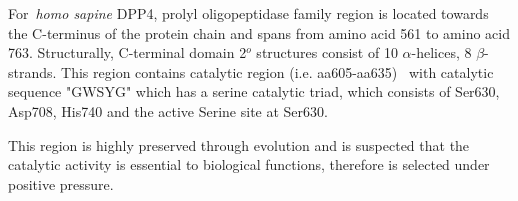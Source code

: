 For~\textit{homo sapine} DPP4, prolyl oligopeptidase family region is located towards the C-terminus of the protein chain and spans from amino acid 561 to amino acid 763. Structurally, C-terminal domain 2$^{o}$ structures consist of 10 $\alpha$-helices, 8 $\beta$-strands. This region contains catalytic region (i.e. aa605-aa635)~\cite{Rawlings1991,Barrett1992,Polgár1992,Rawlings1994} with catalytic sequence "GWSYG" which has a serine catalytic triad, which consists of Ser630, Asp708, His740 and the active Serine site at Ser630. \par
This region is highly preserved through evolution and is suspected that the catalytic activity is essential to biological functions, therefore is selected under positive pressure. 